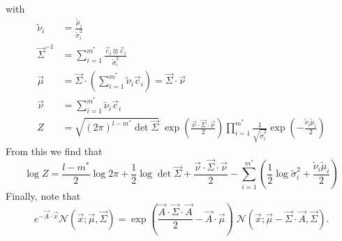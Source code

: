 \documentclass[11pt,twoside]{report}
\def\includebibliography{}
\begin{document}
with
\begin{subequations}
\begin{align}
  \widetilde{\nu}_i &= \frac{\widetilde{\mu}_i}{\widetilde{\sigma}_i^2} \\
  \vec{\Sigma}^{-1} &= \sum_{i=1}^{m^*} \frac{\vec{c}_i \otimes \vec{c}_i}{\widetilde{\sigma}_i^2}
  \label{eq:combined-normals-sigma}
  \\
  \vec{\mu} &=
  \vec{\Sigma} \cdot \left( \sum_{i=1}^{m^*} \widetilde{\nu}_i \vec{c}_i \right)
  = \vec{\Sigma} \cdot \vec{\nu}
  \\
  \vec{\nu} &= \sum_{i=1}^{m^*} \widetilde{\nu}_i \vec{c}_i
  \label{eq:combined-normals-nu}
  \\
  Z &=
  \sqrt{ (2\pi)^{l-m^*} \det{\vec{\Sigma}} }
  \;
  \exp{\left( \frac{\vec{\nu} \cdot \vec{\Sigma} \cdot \vec{\nu}}{2} \right)}
  \prod_{i=1}^{m^*}
  \frac{1}{\sqrt{ \widetilde{\sigma}_i^2 }}
  \exp{\left(-\frac{\widetilde{\nu}_i \widetilde{\mu}_i}{2}\right)}
  \label{eq:combined-normals-Z}
\end{align}
\end{subequations}
From this we find that
\begin{equation}\label{eq:pre-ep-logZ}
  \log{Z} =
  \frac{l-m^*}{2} \log{2\pi} +
  \frac{1}{2} \log\det{\vec{\Sigma}} +
  \frac{\vec{\nu} \cdot \vec{\Sigma} \cdot \vec{\nu}}{2} -
  \sum_{i=1}^{m^*}
  \left(
  \frac{1}{2} \log{\widetilde{\sigma}_i^2} +
  \frac{\widetilde{\nu}_i \widetilde{\mu}_i}{2}
  \right)
\end{equation}
Finally, note that
\begin{equation}\label{eq:biased-normal}
  e^{-\vec{A} \cdot \vec{x}} \mathcal{N}(\vec{x}; \vec{\mu}, \vec{\Sigma})
  =
  \exp{\left( \frac{\vec{A} \cdot \vec{\Sigma} \cdot \vec{A}}{2} - \vec{A} \cdot \vec{\mu} \right)} \;
  \mathcal{N}(\vec{x}; \vec{\mu} - \vec{\Sigma}\cdot\vec{A}, \vec{\Sigma}).
\end{equation}

\ifdefined\includebibliography
  \printbibliography
\fi
\end{document}
